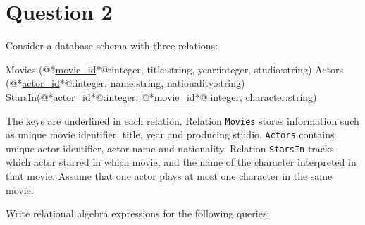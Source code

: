 
\section*{Question 2}

Consider a database schema with three relations:\\

\begin{terminal}
Movies (@*\underline{movie\_id}*@:integer, title:string, year:integer, studio:string)
Actors (@*\underline{actor\_id}*@:integer, name:string, nationality:string)
StarsIn(@*\underline{actor\_id}*@:integer, @*\underline{movie\_id}*@:integer, character:string)
\end{terminal}

The keys are underlined in each relation.
Relation \texttt{Movies} stores information such as unique movie identifier, title, year and  producing studio.
\texttt{Actors} contains unique actor identifier, actor name and nationality.
Relation \texttt{StarsIn} tracks which actor starred in which movie, and the name of the character interpreted in that movie.
Assume that one actor plays at most one character in the same movie.

Write relational algebra expressions for the following queries:

